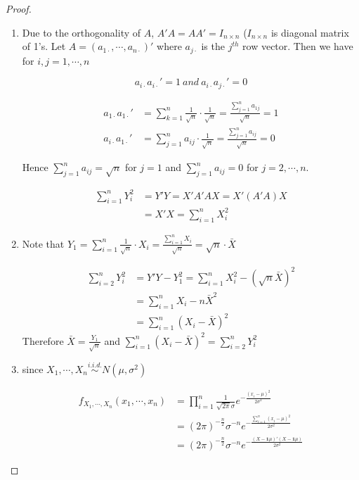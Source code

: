 \documentclass[a4paper, 11pt]{article}
\begin{document}
\begin{proof}
\begin{enumerate}[label=(\alph*)]
	\begin{enumerate}[label=(\roman*)]
	\item  Due to the orthogonality of $A$, $A'A=AA'=I_{n\times n}$ ($I_{n\times n}$ is diagonal matrix of 1's. Let $A=(a_{1\cdot},\cdots,a_{n\cdot })'$ where $a_{j\cdot}$ is the $j^{th}$ row vector. Then we have for $i,j=1,\cdots,n$ 
	
	$$a_{i\cdot }a_{i\cdot}'=1 \ and  \  a_{i\cdot }a_{j\cdot }'=0$$

	
	
	
	\begin{align*}
	a_{1\cdot}a_{1\cdot}'&=\sum_{k=1}^n \frac{1}{\sqrt{n}}\cdot \frac{1}{\sqrt{n}}=\frac{\sum_{j=1}^na_{1j}}{\sqrt{n}}=1
\\
a_{i\cdot}a_{1\cdot}'&=\sum_{j=1}^na_{ij}\cdot\frac{1}{\sqrt{n}}=\frac{\sum_{j=1}^na_{ij}}{\sqrt{n}}=0
	\end{align*}
	
	Hence  $\sum_{j=1}^n a_{ij}=\sqrt{n}$ for $j=1$ and  $\sum_{j=1}^n a_{ij}=0$ for $j=2,\cdots,n$.
	
	\begin{align*}
	\sum_{i=1}^n Y_i ^2& =Y'Y = X'A'AX=X'(A'A)X\\
	& = X'X=\sum_{i=1}^n X_i^2 
	\end{align*}
	
	\item
	Note that $Y_1= \sum_{i=1}^n\frac{1}{\sqrt{n}}\cdot X_i=  \frac{\sum_{i=1}^nX_i}{\sqrt{n}}=\sqrt{n}\cdot\bar{X}$
	
	\begin{align*}
	\sum_{i=2}^nY_i^2&=	Y'Y-Y_1^2=\sum_{i=1}^n X_i^2-\left(\sqrt{n}\bar{X}\right)^2\\
	& = \sum_{i=1}^nX_i-n\bar{X}^2 \\
	& =\sum_{i=1}^n \left(X_i-\bar{X}\right)^2
	\end{align*}
	Therefore $\bar{X}=\frac{Y_1}{\sqrt{n}}$ and $\sum_{i=1}^n \left(X_i-\bar{X}\right)^2 = \sum_{i=2}^n Y_i^2$
	
	\item since $X_1,\cdots,X_n\stackrel{i.i.d.}{\sim}N\left(\mu,\sigma^2\right)$
	
	\begin{align*}
	f_{X_1,\cdots,X_n}\left(x_1,\cdots,x_n\right)& = \prod_{i=1}^n \frac{1}{\sqrt{2\pi}\sigma}e^{-\frac{(x_i-\mu)^2}{2\sigma^2}}\\
	& = \left(2\pi\right)^{-\frac{n}{2}}\sigma^{-n}e^{-\frac{\sum_{i=1}^n\left(x_i-\mu\right)^2}{2\sigma^2}}\\
	& = \left(2\pi\right)^{-\frac{n}{2}}\sigma^{-n}e^{-\frac{(X-\mathbf{1}\mu)'(X-\mathbf{1}\mu)}{2\sigma^2}}
	\end{align*}
	

\end{enumerate}
\end{enumerate}
\end{proof}
\end{document}
